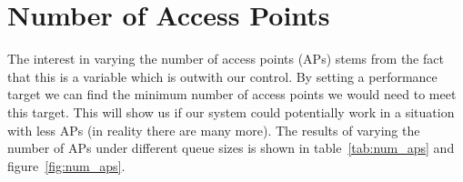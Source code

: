     \section{Number of Access Points}\label{data_gathering_performance_number_of_access_points}

        The interest in varying the number of access points (APs) stems from the fact that this is a variable which is outwith our control. By setting a performance target we can find the minimum number of access points we would need to meet this target. This will show us if our system could potentially work in a situation with less APs (in reality there are many more). The results of varying the number of APs under different queue sizes is shown in table~\ref{tab:num_aps} and figure~\ref{fig:num_aps}.

